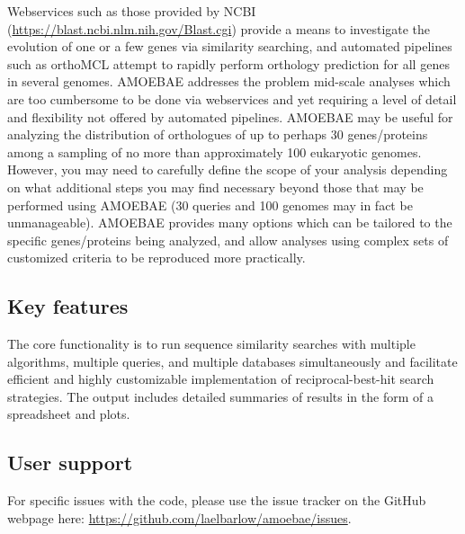 \documentclass[12pt,letterpaper]{article}
\begin{document}
\begin{linenumbers}
    Webservices such as those provided by NCBI
    (\url{https://blast.ncbi.nlm.nih.gov/Blast.cgi}) \citep{camacho2009}
    provide a means to investigate the evolution of one or a few genes via
    similarity searching, and automated pipelines such as orthoMCL
    \citep{li2003} attempt to rapidly perform orthology prediction for all
    genes in several genomes. AMOEBAE addresses the problem mid-scale analyses
    which are too cumbersome to be done via webservices and yet requiring a
    level of detail and flexibility not offered by automated pipelines. AMOEBAE
    may be useful for analyzing the distribution of orthologues of up to
    perhaps 30 genes/proteins among a sampling of no more than approximately
    100 eukaryotic genomes.  However, you may need to carefully define the
    scope of your analysis depending on what additional steps you may find
    necessary beyond those that may be performed using AMOEBAE (30 queries and
    100 genomes may in fact be unmanageable). AMOEBAE provides many options
    which can be tailored to the specific genes/proteins being analyzed, and
    allow analyses using complex sets of customized criteria to be reproduced
    more practically. 


\subsection{Key features}

The core functionality is to run sequence similarity searches with multiple
    algorithms, multiple queries, and multiple databases simultaneously and
    facilitate efficient and highly customizable implementation of
    reciprocal-best-hit search strategies. The output includes detailed
    summaries of results in the form of a spreadsheet and plots.

\subsection{User support}

For specific issues with the code, please use the issue tracker on the GitHub
    webpage here: \url{https://github.com/laelbarlow/amoebae/issues}. 


\end{linenumbers}
\end{document}
